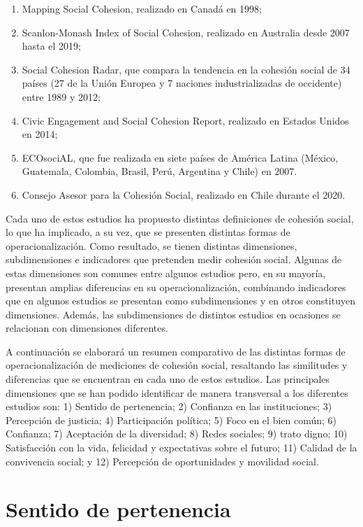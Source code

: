 \documentclass[
  12pt,
]{book}
\begin{document}
\begin{enumerate}
\def\labelenumi{\arabic{enumi})}
\item
  Mapping Social Cohesion, realizado en Canadá en 1998;
\item
  Scanlon-Monash Index of Social Cohesion, realizado en Australia desde 2007 hasta el 2019;
\item
  Social Cohesion Radar, que compara la tendencia en la cohesión social de 34 países (27 de la Unión Europea y 7 naciones industrializadas de occidente) entre 1989 y 2012;
\item
  Civic Engagement and Social Cohesion Report, realizado en Estados Unidos en 2014;
\item
  ECOsociAL, que fue realizada en siete países de América Latina (México, Guatemala, Colombia, Brasil, Perú, Argentina y Chile) en 2007.
\item
  Consejo Asesor para la Cohesión Social, realizado en Chile durante el 2020.
\end{enumerate}

Cada uno de estos estudios ha propuesto distintas definiciones de cohesión social, lo que ha implicado, a su vez, que se presenten distintas formas de operacionalización. Como resultado, se tienen distintas dimensiones, subdimensiones e indicadores que pretenden medir cohesión social. Algunas de estas dimensiones son comunes entre algunos estudios pero, en su mayoría, presentan amplias diferencias en su operacionalización, combinando indicadores que en algunos estudios se presentan como subdimensiones y en otros constituyen dimensiones. Además, las subdimensiones de distintos estudios en ocasiones se relacionan con dimensiones diferentes.

A continuación se elaborará un resumen comparativo de las distintas formas de operacionalización de mediciones de cohesión social, resaltando las similitudes y diferencias que se encuentran en cada uno de estos estudios. Las principales dimensiones que se han podido identificar de manera transversal a los diferentes estudios son: 1) Sentido de pertenencia; 2) Confianza en las instituciones; 3) Percepción de justicia; 4) Participación política; 5) Foco en el bien común; 6) Confianza; 7) Aceptación de la diversidad; 8) Redes sociales; 9) trato digno; 10) Satisfacción con la vida, felicidad y expectativas sobre el futuro; 11) Calidad de la convivencia social; y 12) Percepción de oportunidades y movilidad social.

\hypertarget{sentido-de-pertenencia}{%
\section{Sentido de pertenencia}\label{sentido-de-pertenencia}}
\end{document}
